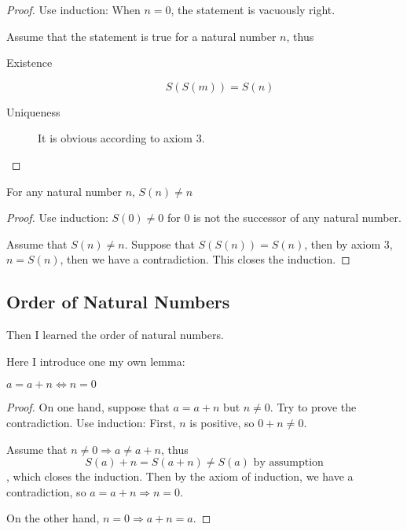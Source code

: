 \begin{proof}
Use induction: When $n=0$, the statement is vacuously right.

Assume that the statement is true for a natural number $n$, thus
\begin{description}
\item[Existence] 
\[
S(S(m)) = S(n)
\]
\item[Uniqueness]
It is obvious according to axiom 3.
\end{description}
\end{proof}

\begin{prop}
For any natural number $n$, $S(n) \neq n$
\end{prop}
\begin{proof}
Use induction: $S(0) \neq 0$ for 0 is not the successor of any natural number.

Assume that $S(n) \neq n$. Suppose that $S(S(n)) = S(n)$, then by axiom 3, $n=S(n)$, then we have a 
contradiction. This closes the induction. \qedhere
\end{proof}

\subsection{Order of Natural Numbers}
Then I learned the order of natural numbers.

Here I introduce one my own lemma:
\begin{lem}
$a=a+n \Leftrightarrow n=0$  \label{lem3}
\end{lem}
\begin{proof}
On one hand, suppose that $a=a+n$ but $n \neq 0$. Try to prove the contradiction. Use induction:
First, $n$ is positive, so $0+n \neq 0$.

Assume that $n \neq 0 \Rightarrow a \neq a+n$, thus 
\[
S(a)+n=S(a+n) \neq S(a) \text{ by assumption}
\], which closes the induction. Then by the axiom of induction, we have a contradiction, so 
$a=a+n \Rightarrow n=0$.

On the other hand, $n=0 \Rightarrow a+n=a$. \qedhere
\end{proof}

